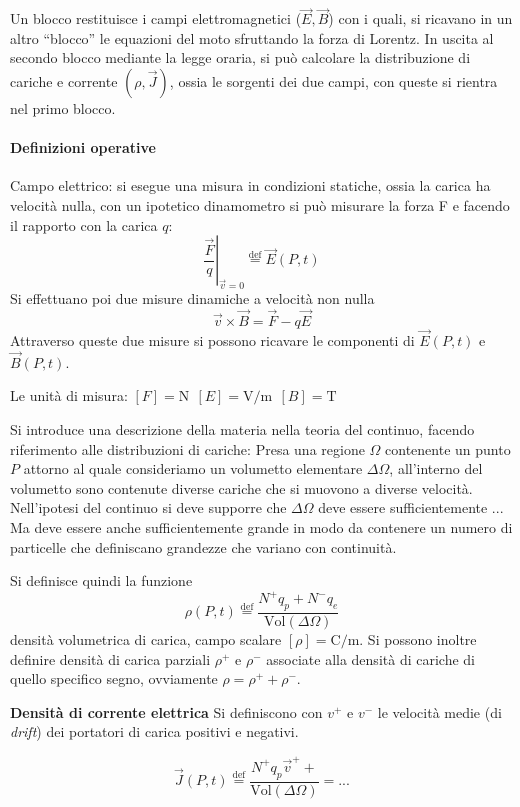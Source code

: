 Un blocco restituisce i campi elettromagnetici ($\vec{E},\vec{B}$) con i quali, si ricavano in un altro
``blocco'' le equazioni del moto sfruttando la forza di Lorentz.
In uscita al secondo blocco mediante la legge oraria, si può calcolare la distribuzione di cariche e 
corrente $\left(\rho,\vec{J}\right)$, ossia le sorgenti dei due campi, con queste si rientra nel primo blocco.

\paragraph{Definizioni operative}
Campo elettrico:
si esegue una misura in condizioni statiche, ossia la carica ha velocità nulla, con un ipotetico 
dinamometro si può misurare la forza F e facendo il rapporto con la carica $q$:
$$
\left.\frac{\vec{F}}{q}\right|_{\vec{v}=0} \stackrel{\text{def}}{=} \vec{E}(P,t)
$$
Si effettuano poi due misure dinamiche a velocità non nulla
$$
\vec{v}\times\vec{B} = \vec{F} - q\vec{E}
$$
Attraverso queste due misure si possono ricavare le componenti di $\vec{E}(P,t)$ e $\vec{B}(P,t)$.


Le unità di misura:
$[F] = \si{\newton}\ \  [E] = \si{\volt\per\meter} \ \ [B] = \si{\tesla}$

Si introduce una descrizione della materia nella teoria del continuo, facendo riferimento alle 
distribuzioni di cariche:
Presa una regione $\Omega$ contenente un punto $P$ attorno al quale consideriamo un volumetto elementare 
$\Delta\Omega$, all'interno del volumetto sono contenute diverse cariche che si muovono a diverse 
velocità. Nell'ipotesi del continuo si deve supporre che $\Delta \Omega$ deve essere sufficientemente ...
Ma deve essere anche sufficientemente grande in modo da contenere un numero di particelle che definiscano
grandezze che variano con continuità.

Si definisce quindi la funzione 
$$
\rho(P,t) \stackrel{\text{def}}{=} \frac{N^+q_p+N^-q_e}{\text{Vol}(\Delta\Omega)}
$$
densità volumetrica di carica, campo scalare $[\rho] = \si{\coulomb\per\meter}$.
Si possono inoltre definire densità di carica parziali $\rho^+$ e $\rho^-$ associate alla densità
di cariche di quello specifico segno, ovviamente $\rho = \rho^+ + \rho^-$.

\textbf{Densità di corrente elettrica}
Si definiscono con $v^+$ e $v^-$ le velocità medie (di \textit{drift}) dei portatori di carica positivi e negativi.

$$
\vec{J}(P,t) \stackrel{\text{def}}{=} \frac{N^+q_p\vec{v}^+ + }{\text{Vol}(\Delta \Omega)} = ...
$$

